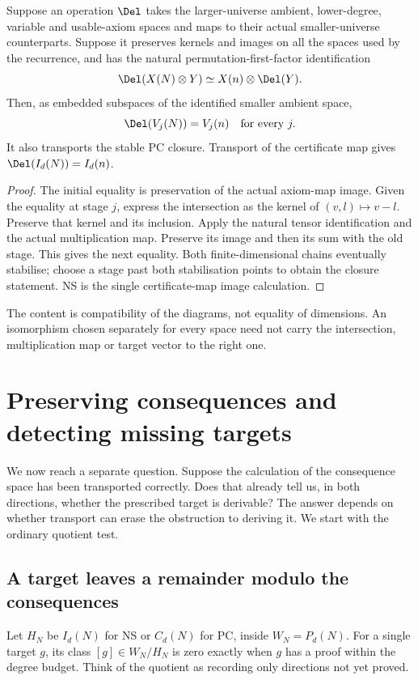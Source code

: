 \begin{lemma}\label{tx:lem:closure-transport}
Suppose an operation $\Del$ takes the larger-universe ambient, lower-degree,
variable and usable-axiom spaces and maps to their actual smaller-universe
counterparts. Suppose it preserves kernels and images on all the spaces
used by the recurrence, and has the natural permutation-first-factor
identification
\[
 \Del(X(N)\otimes Y)\simeq X(n)\otimes\Del(Y).
\]
Then, as embedded subspaces of the identified smaller ambient space,
\[
                         \Del(V_j(N))=V_j(n)
                         \quad\text{for every }j.
\]
It also transports the stable PC closure. Transport of the certificate
map gives $\Del(I_d(N))=I_d(n)$.
\end{lemma}
\begin{proof}
The initial equality is preservation of the actual axiom-map image.
Given the equality at stage $j$, express the intersection as the kernel
of $(v,l)\mapsto v-l$. Preserve that kernel and its inclusion. Apply
the natural tensor identification and the actual multiplication map.
Preserve its image and then its sum with the old stage. This gives the
next equality. Both finite-dimensional chains eventually stabilise;
choose a stage past both stabilisation points to obtain the closure
statement. NS is the single certificate-map image calculation.
\end{proof}

\begin{checkpoint}
The content is compatibility of the diagrams, not equality of dimensions.
An isomorphism chosen separately for every space need not carry the
intersection, multiplication map or target vector to the right one.
\end{checkpoint}

\section{Preserving consequences and detecting missing targets}\label{tx:sec:target-reflection}
We now reach a separate question. Suppose the calculation of the
consequence space has been transported correctly. Does that already
tell us, in both directions, whether the prescribed target is derivable?
The answer depends on whether transport can erase the obstruction
to deriving it. We start with the ordinary quotient test.

\subsection{A target leaves a remainder modulo the consequences}
Let $H_N$ be $I_d(N)$ for NS or $C_d(N)$ for PC, inside
$W_N=P_d(N)$. For a single target $g$, its class $[g]\in W_N/H_N$
is zero exactly when $g$ has a proof within the degree budget.
Think of the quotient as recording only directions not yet proved.

